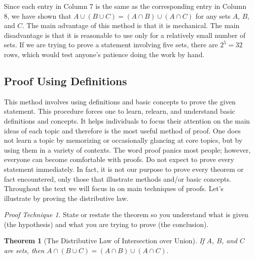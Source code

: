 \documentclass[10pt,]{book}
\theoremstyle{plain}
\newtheorem{theorem}{Theorem}[section]
\theoremstyle{definition}
\theoremstyle{definition}
\theoremstyle{definition}
\begin{document}
\par
Since each entry in Column 7 is the same as the corresponding entry in Column 8, we have shown that \(A\cup  (B \cup  C) = (A\cap B) \cup  (A \cap C)\) for any sets \(A\), \(B\), and \(C\). The main advantage of this method is that it is mechanical. The main disadvantage is that it is reasonable to use only for a relatively small number of sets. If we are trying to prove a statement involving five sets, there are \(2^5 = 32\) rows, which would test anyone's patience doing the work by hand. %
\typeout{************************************************}
\typeout{************************************************}
\subsection[Proof Using Definitions]{Proof Using Definitions}\label{ss-proofs-using-definitions-sets}
This method involves using definitions and basic concepts to prove the given statement. This procedure forces one to learn, relearn, and understand basic definitions and concepts. It helps individuals to focus their attention on the main ideas of each topic and therefore is the most useful method of proof. One does not learn a topic by memorizing or occasionally glancing at core topics, but by using them in a variety of contexts. The word proof panics most people; however, everyone can become comfortable with proofs. Do not expect to prove every statement immediately. In fact, it is not our purpose to prove every theorem or fact encountered, only those that illustrate methods and/or basic concepts. Throughout the text we will
focus in on main techniques of proofs. Let's illustrate by proving the distributive law.%
\par
 \emph{Proof Technique 1.}  State or restate the theorem so you understand what is given (the hypothesis) and what you are trying to prove (the conclusion).%
\begin{theorem}[The Distributive Law of Intersection over Union]\label{th-distr-law-i-over-u}
If \(A\), \(B\), and \(C\) are sets, then \(A\cap  (B \cup  C) = (A\cap B) \cup  (A \cap  C)\).%
\end{theorem}
\end{document}
